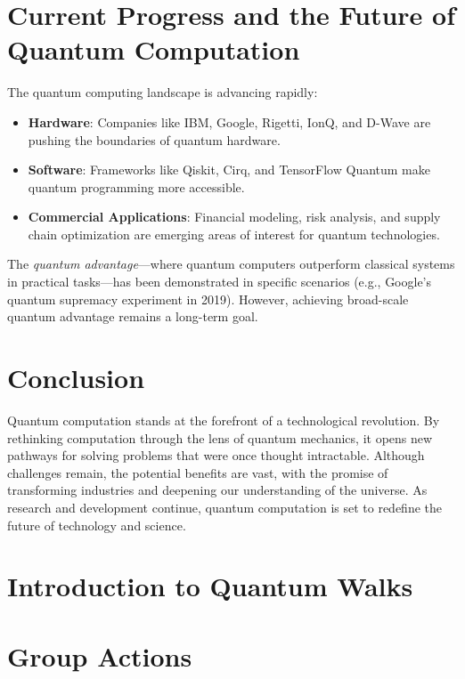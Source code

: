 \documentclass[11pt]{article}
\theoremstyle{definition}
\begin{document}
\section*{Current Progress and the Future of Quantum Computation}
The quantum computing landscape is advancing rapidly:
\begin{itemize}
    \item \textbf{Hardware}: Companies like IBM, Google, Rigetti, IonQ, and D-Wave are pushing the boundaries of quantum hardware.
    \item \textbf{Software}: Frameworks like Qiskit, Cirq, and TensorFlow Quantum make quantum programming more accessible.
    \item \textbf{Commercial Applications}: Financial modeling, risk analysis, and supply chain optimization are emerging areas of interest for quantum technologies.
\end{itemize}
The \textit{quantum advantage}---where quantum computers outperform classical systems in practical tasks---has been demonstrated in specific scenarios (e.g., Google's quantum supremacy experiment in 2019). However, achieving broad-scale quantum advantage remains a long-term goal.

\section*{Conclusion}
Quantum computation stands at the forefront of a technological revolution. By rethinking computation through the lens of quantum mechanics, it opens new pathways for solving problems that were once thought intractable. Although challenges remain, the potential benefits are vast, with the promise of transforming industries and deepening our understanding of the universe. As research and development continue, quantum computation is set to redefine the future of technology and science.




\section{Introduction to Quantum Walks}






\section{Group Actions}
\end{document}
